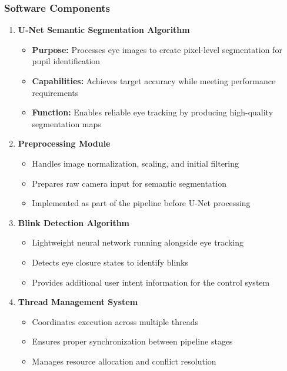 \subsubsection{Software Components}
\begin{enumerate}
\item \textbf{U-Net Semantic Segmentation Algorithm}
   \begin{itemize}
   \item \textbf{Purpose:} Processes eye images to create pixel-level segmentation for pupil identification
   \item \textbf{Capabilities:} Achieves target accuracy while meeting performance requirements
   \item \textbf{Function:} Enables reliable eye tracking by producing high-quality segmentation maps
   \end{itemize}

\item \textbf{Preprocessing Module}
   \begin{itemize}
   \item Handles image normalization, scaling, and initial filtering
   \item Prepares raw camera input for semantic segmentation
   \item Implemented as part of the pipeline before U-Net processing
   \end{itemize}

\item \textbf{Blink Detection Algorithm}
   \begin{itemize}
   \item Lightweight neural network running alongside eye tracking
   \item Detects eye closure states to identify blinks
   \item Provides additional user intent information for the control system
   \end{itemize}

\item \textbf{Thread Management System}~\cite{park2022thread}
   \begin{itemize}
   \item Coordinates execution across multiple threads
   \item Ensures proper synchronization between pipeline stages
   \item Manages resource allocation and conflict resolution
   \end{itemize}
\end{enumerate}

